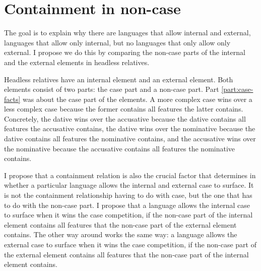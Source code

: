 %
%
%

\section{Containment in non-case}\label{sec:containment-noncase}

The goal is to explain why there are languages that allow internal and external, languages that allow only internal, but no languages that only allow only external. I propose we do this by comparing the non-case parts of the internal and the external elements in headless relatives.

Headless relatives have an internal element and an external element. Both elements consist of two parts: the case part and a non-case part. Part \ref{part:case-facts} was about the case part of the elements. A more complex case wins over a less complex case because the former contains all features the latter contains. Concretely, the dative wins over the accusative because the dative contains all features the accusative contains, the dative wins over the nominative because the dative contains all features the nominative contains, and the accusative wins over the nominative because the accusative contains all features the nominative contains.

I propose that a containment relation is also the crucial factor that determines in whether a particular language allows the internal and external case to surface. It is not the containment relationship having to do with case, but the one that has to do with the non-case part. I propose that a language allows the internal case to surface when it wins the case competition, if the non-case part of the internal element contains all features that the non-case part of the external element contains. The other way around works the same way: a language allows the external case to surface when it wins the case competition, if the non-case part of the external element contains all features that the non-case part of the internal element contains.

